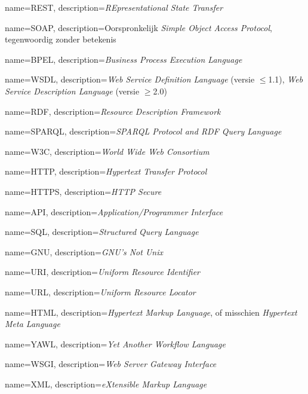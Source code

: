 {
    name=REST,
    description={\emph{REpresentational State Transfer}}
}

{
    name=SOAP,
    description={Oorspronkelijk \emph{Simple Object Access Protocol},
                 tegenwoordig zonder betekenis}
}

{
    name=BPEL,
    description={\emph{Business Process Execution Language}}
}

{
    name=WSDL,
    description={\emph{Web Service Definition Language} (versie $\le$1.1),
                 \emph{Web Service Description Language} (versie $\ge$2.0)}
}

{
    name=RDF,
    description={\emph{Resource Description Framework}}
}

{
    name=SPARQL,
    description={\emph{\gls{SPARQL} Protocol and \gls{RDF} Query Language}}
}

{
    name=W3C,
    description={\emph{World Wide Web Consortium}}
}

{
    name=HTTP,
    description={\emph{Hypertext Transfer Protocol}}
}

{
    name=HTTPS,
    description={\emph{\gls{HTTP} Secure}}
}

{
    name=API,
    description={\emph{Application/Programmer Interface}}
}

{
    name=SQL,
    description={\emph{Structured Query Language}}
}

{
    name=GNU,
    description={\emph{\gls{GNU}'s Not Unix}}
}

{
    name=URI,
    description={\emph{Uniform Resource Identifier}}
}

{
    name=URL,
    description={\emph{Uniform Resource Locator}}
}

{
    name=HTML,
    description={\emph{Hypertext Markup Language}, of misschien
                 \emph{Hypertext Meta Language}}
}

{
    name=YAWL,
    description={\emph{Yet Another Workflow Language}}
}

{
    name=WSGI,
    description={\emph{Web Server Gateway Interface}}
}

{
    name=XML,
    description={\emph{eXtensible Markup Language}}
}
